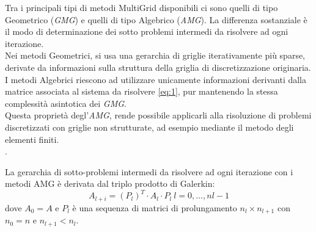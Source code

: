 Tra i principali tipi di metodi MultiGrid disponibili ci sono quelli di tipo Geometrico (\emph{GMG}) e quelli di tipo Algebrico (\emph{AMG}).
La differenza sostanziale è il modo di determinazione dei sotto problemi intermedi da risolvere ad ogni iterazione.\\
Nei metodi Geometrici, si usa una gerarchia di griglie iterativamente più sparse, %
derivate da informazioni sulla struttura della griglia di discretizzazione originaria.\\
I metodi Algebrici riescono ad utilizzare unicamente informazioni derivanti dalla matrice associata al sistema da risolvere \ref{eq:1},
pur mantenendo la stessa complessità asintotica dei \emph{GMG}.\\
Questa proprietà degl'\emph{AMG}, rende possibile applicarli 
alla risoluzione di problemi discretizzati con griglie non strutturate,
ad esempio mediante il metodo degli elementi finiti.\\
\cite{AMGgeneralANY}.\\
\par\null\par	%
La gerarchia di sotto-problemi intermedi da risolvere ad ogni iterazione con i metodi AMG è derivata dal triplo prodotto di Galerkin:\\
\begin{equation} \label{eq:galerkin}
A_{l+i} = (P_l)^T \cdot A_l \cdot P_l~l=0,\dots,nl-1
\end{equation}
dove $A_0 = A$ \cite{AMG4PSBLAS} e $P_l$ è una sequenza di matrici di prolungamento $n_l \times n_{l+1}$ con $n_0=n$ e $n_{l+1}<n_l$.\\
\par\null\par
